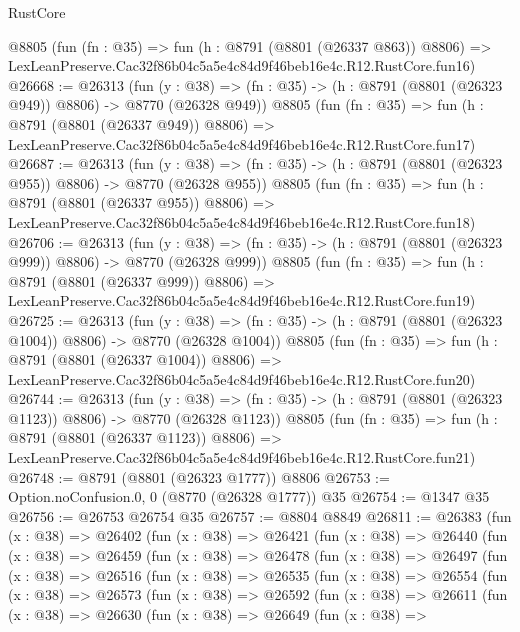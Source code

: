\begin{lexlean}{RustCore}
\begin{coremodule}
    @8805
    (fun (fn : @35) =>
    fun (h : @8791 (@8801 (@26337 @863)) @8806) =>
    LexLeanPreserve.Cac32f86b04c5a5e4c84d9f46beb16e4c.R12.RustCore.fun16)
@26668 := @26313
    (fun (y : @38) => (fn : @35) -> (h : @8791 (@8801 (@26323 @949)) @8806) -> @8770 (@26328 @949))
    @8805
    (fun (fn : @35) =>
    fun (h : @8791 (@8801 (@26337 @949)) @8806) =>
    LexLeanPreserve.Cac32f86b04c5a5e4c84d9f46beb16e4c.R12.RustCore.fun17)
@26687 := @26313
    (fun (y : @38) => (fn : @35) -> (h : @8791 (@8801 (@26323 @955)) @8806) -> @8770 (@26328 @955))
    @8805
    (fun (fn : @35) =>
    fun (h : @8791 (@8801 (@26337 @955)) @8806) =>
    LexLeanPreserve.Cac32f86b04c5a5e4c84d9f46beb16e4c.R12.RustCore.fun18)
@26706 := @26313
    (fun (y : @38) => (fn : @35) -> (h : @8791 (@8801 (@26323 @999)) @8806) -> @8770 (@26328 @999))
    @8805
    (fun (fn : @35) =>
    fun (h : @8791 (@8801 (@26337 @999)) @8806) =>
    LexLeanPreserve.Cac32f86b04c5a5e4c84d9f46beb16e4c.R12.RustCore.fun19)
@26725 := @26313
    (fun (y : @38) =>
    (fn : @35) -> (h : @8791 (@8801 (@26323 @1004)) @8806) -> @8770 (@26328 @1004))
    @8805
    (fun (fn : @35) =>
    fun (h : @8791 (@8801 (@26337 @1004)) @8806) =>
    LexLeanPreserve.Cac32f86b04c5a5e4c84d9f46beb16e4c.R12.RustCore.fun20)
@26744 := @26313
    (fun (y : @38) =>
    (fn : @35) -> (h : @8791 (@8801 (@26323 @1123)) @8806) -> @8770 (@26328 @1123))
    @8805
    (fun (fn : @35) =>
    fun (h : @8791 (@8801 (@26337 @1123)) @8806) =>
    LexLeanPreserve.Cac32f86b04c5a5e4c84d9f46beb16e4c.R12.RustCore.fun21)
@26748 := @8791 (@8801 (@26323 @1777)) @8806
@26753 := Option.noConfusion.{0, 0} (@8770 (@26328 @1777)) @35
@26754 := @1347 @35
@26756 := @26753 @26754 @35
@26757 := @8804 @8849
@26811 := @26383
    (fun (x : @38) =>
    @26402
      (fun (x : @38) =>
      @26421
        (fun (x : @38) =>
        @26440
          (fun (x : @38) =>
          @26459
            (fun (x : @38) =>
            @26478
              (fun (x : @38) =>
              @26497
                (fun (x : @38) =>
                @26516
                  (fun (x : @38) =>
                  @26535
                    (fun (x : @38) =>
                    @26554
                      (fun (x : @38) =>
                      @26573
                        (fun (x : @38) =>
                        @26592
                          (fun (x : @38) =>
                          @26611
                            (fun (x : @38) =>
                            @26630
                              (fun (x : @38) =>
                              @26649
                                (fun (x : @38) =>

\end{coremodule}
\end{lexlean}
